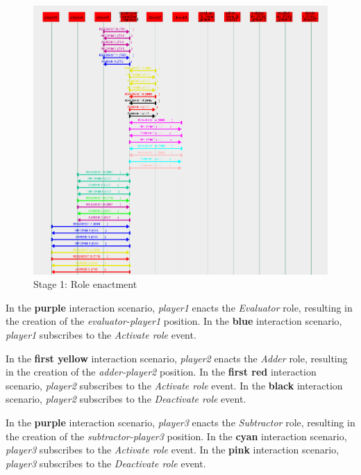 \begin{figure}[H]
	\centering
	\includegraphics[width=\textwidth]{images/examples/example2-stage1.png}
	\caption{Stage 1: Role enactment}
	\label{figure:example2-stage1}
\end{figure}

In the \textbf{purple} interaction scenario, \textit{player1} enacts the \textit{Evaluator} role, resulting in the creation of the \textit{evaluator-player1} position.
In the \textbf{blue} interaction scenario, \textit{player1} subscribes to the \textit{Activate role} event.

In the \textbf{first yellow} interaction scenario, \textit{player2} enacts the \textit{Adder} role, resulting in the creation of the \textit{adder-player2} position.
In the \textbf{first red} interaction scenario, \textit{player2} subscribes to the \textit{Activate role} event.
In the \textbf{black} interaction scenario, \textit{player2} subscribes to the \textit{Deactivate role} event.

In the \textbf{purple} interaction scenario, \textit{player3} enacts the \textit{Subtractor} role, resulting in the creation of the \textit{subtractor-player3} position.
In the \textbf{cyan} interaction scenario, \textit{player3} subscribes to the \textit{Activate role} event.
In the \textbf{pink} interaction scenario, \textit{player3} subscribes to the \textit{Deactivate role} event.


